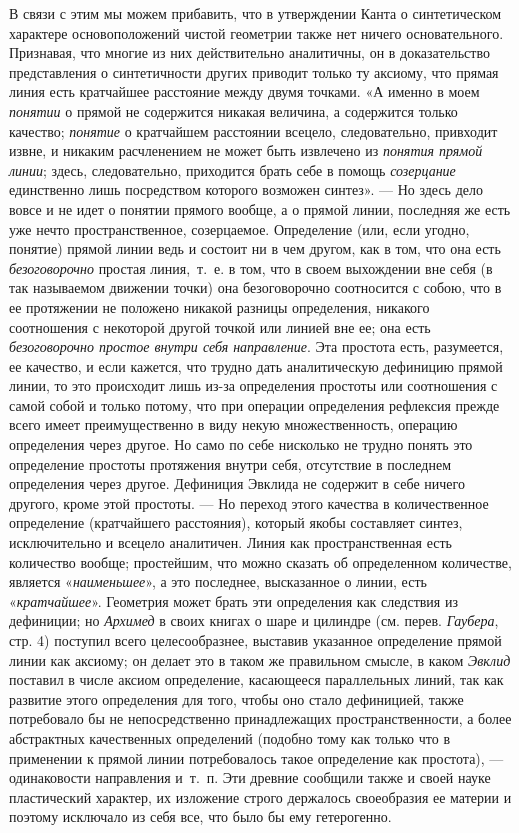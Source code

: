 {В связи с этим мы можем прибавить, что в утверждении Канта о синтетическом
характере основоположений чистой геометрии также нет ничего основательного.
Признавая, что многие из них действительно аналитичны, он в доказательство
представления о синтетичности других приводит только ту аксиому, что прямая
линия есть кратчайшее расстояние между двумя точками. «А именно в моем
{\em понятии} о прямой не содержится никакая величина,
а содержится только качество; {\em понятие} о
кратчайшем расстоянии всецело, следовательно, привходит извне, и никаким
расчленением не может быть извлечено из {\em понятия
прямой линии}; здесь, следовательно, приходится брать себе в помощь
{\em созерцание} единственно лишь посредством которого
возможен синтез». — Но здесь дело вовсе и не идет о понятии прямого вообще,
а о прямой линии, последняя же есть уже нечто пространственное,
созерцаемое. Определение (или, если угодно, понятие) прямой линии ведь и
состоит ни в чем другом, как в том, что она есть
{\em безоговорочно} простая линия,~т.~е. в том, что в
своем выхождении вне себя (в так называемом движении точки) она
безоговорочно соотносится с собою, что в ее протяжении не положено никакой
разницы определения, никакого соотношения с некоторой другой точкой или
линией вне ее; она есть {\em безоговорочно простое
внутри себя направление}. Эта простота есть, разумеется, ее качество, и
если кажется, что трудно дать аналитическую дефиницию прямой линии, то это
происходит лишь из-за определения простоты или соотношения с самой собой и
только потому, что при операции определения рефлексия прежде всего имеет
преимущественно в виду некую множественность, операцию определения через
другое. Но само по себе нисколько не трудно понять это определение простоты
протяжения внутри себя, отсутствие в последнем определения через другое.
Дефиниция Эвклида не содержит в себе ничего другого, кроме этой простоты. —
Но переход этого качества в количественное определение (кратчайшего
расстояния), который якобы составляет синтез, исключительно и всецело
аналитичен. Линия как пространственная есть количество вообще; простейшим,
что можно сказать об определенном количестве, является
«{\em наименьшее}», а это последнее, высказанное о
линии, есть «{\em кратчайшее}». Геометрия может брать
эти определения как следствия из дефиниции; но
{\em Архимед} в своих книгах о шаре и цилиндре (см.
перев. {\em Гаубера}, стр. 4) поступил всего
целесообразнее, выставив указанное определение прямой линии как аксиому; он
делает это в таком же правильном смысле, в каком
{\em Эвклид} поставил в числе аксиом определение,
касающееся параллельных линий, так как развитие этого определения для того,
чтобы оно стало дефиницией, также потребовало бы не непосредственно
принадлежащих пространственности, а более абстрактных качественных
определений (подобно тому как только что в применении к прямой линии
потребовалось такое определение как простота), — одинаковости направления
и~т.~п. Эти древние сообщили также и своей науке пластический характер, их
изложение строго держалось своеобразия ее материи и поэтому исключало из
себя все, что было бы ему гетерогенно.

}

